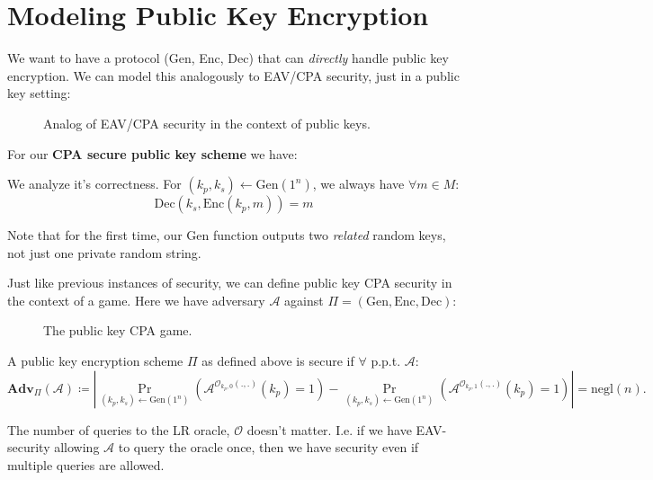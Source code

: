 \section{Modeling Public Key Encryption}
We want to have a protocol (Gen, Enc, Dec) that can \emph{directly} handle public key encryption. We can model this analogously to EAV/CPA security, just in a public key setting:

\begin{figure}[H]
	\centering
	\caption{Analog of EAV/CPA security in the context of public keys.}
	\label{fig:pubeavcpa}
\end{figure}

\begin{definition}
	For our \textbf{CPA secure public key scheme} we have:
	We analyze it's correctness. For \((k_p, k_s) \gets \mathrm{Gen}(1^n)\), we always have \(\forall m \in M\):
	\[
		\mathrm{Dec}(k_s, \mathrm{Enc}(k_p, m)) = m
	\] 
\end{definition}
\begin{remark}
	Note that for the first time, our Gen function outputs two \emph{related} random keys, not just one private random string.
\end{remark}

Just like previous instances of security, we can define public key CPA security in the context of a game. Here we have adversary \(\mathcal{A} \) against \(\Pi = (\mathrm{Gen, Enc, Dec})\):

\begin{figure}[H]
	\centering
	\caption{The public key CPA game.}
	\label{fig:pubcpasec}
\end{figure}

\begin{definition}
	A public key encryption scheme \(\Pi\) as defined above is secure if \(\forall\) p.p.t. \(\mathcal{A} \):
	\[
		\mathbf{Adv}_\Pi (\mathcal{A}) \coloneqq \left| 
			\Pr_{(k_p, k_s) \gets \mathrm{Gen}(1^n)} (\mathcal{A}^{\mathcal{O}_{k_p, 0} (.,.)}(k_p)=1) -
		  \Pr_{(k_p, k_s) \gets \mathrm{Gen}(1^n)} (\mathcal{A}^{\mathcal{O}_{k_p, 1} (.,.)}(k_p)=1)
		\right| =
		\mathrm{negl}(n).
	\]
\end{definition}
\begin{remark}
	The number of queries to the LR oracle, \(\mathcal{O} \) doesn't matter. I.e. if we have EAV-security allowing \(\mathcal{A} \) to query the oracle once, then we have security even if multiple queries are allowed.
\end{remark}

